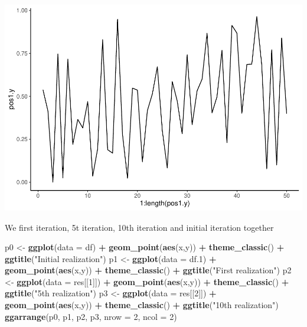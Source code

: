 \documentclass[
]{article}
\newenvironment{Shaded}{\begin{snugshade}}{\end{snugshade}}
\newcommand{\DataTypeTok}[1]{\textcolor[rgb]{0.13,0.29,0.53}{#1}}
\newcommand{\DecValTok}[1]{\textcolor[rgb]{0.00,0.00,0.81}{#1}}
\newcommand{\FloatTok}[1]{\textcolor[rgb]{0.00,0.00,0.81}{#1}}
\newcommand{\KeywordTok}[1]{\textcolor[rgb]{0.13,0.29,0.53}{\textbf{#1}}}
\newcommand{\NormalTok}[1]{#1}
\newcommand{\OperatorTok}[1]{\textcolor[rgb]{0.81,0.36,0.00}{\textbf{#1}}}
\newcommand{\StringTok}[1]{\textcolor[rgb]{0.31,0.60,0.02}{#1}}
\begin{document}
\includegraphics{project2_files/figure-latex/unnamed-chunk-27-2.pdf}

We first iteration, 5t iteration, 10th iteration and initial iteration
together

\begin{Shaded}
\begin{Highlighting}[]
\NormalTok{p0 <-}\StringTok{ }\KeywordTok{ggplot}\NormalTok{(}\DataTypeTok{data =}\NormalTok{ df) }\OperatorTok{+}\StringTok{ }\KeywordTok{geom_point}\NormalTok{(}\KeywordTok{aes}\NormalTok{(x,y)) }\OperatorTok{+}\StringTok{ }\KeywordTok{theme_classic}\NormalTok{() }\OperatorTok{+}\StringTok{ }\KeywordTok{ggtitle}\NormalTok{(}\StringTok{"Initial realization"}\NormalTok{)}
\NormalTok{p1 <-}\StringTok{ }\KeywordTok{ggplot}\NormalTok{(}\DataTypeTok{data =}\NormalTok{ df}\FloatTok{.1}\NormalTok{) }\OperatorTok{+}\StringTok{ }\KeywordTok{geom_point}\NormalTok{(}\KeywordTok{aes}\NormalTok{(x,y)) }\OperatorTok{+}\StringTok{ }\KeywordTok{theme_classic}\NormalTok{() }\OperatorTok{+}\StringTok{ }\KeywordTok{ggtitle}\NormalTok{(}\StringTok{"First realization"}\NormalTok{)}
\NormalTok{p2 <-}\StringTok{ }\KeywordTok{ggplot}\NormalTok{(}\DataTypeTok{data =}\NormalTok{ res[[}\DecValTok{1}\NormalTok{]]) }\OperatorTok{+}\StringTok{ }\KeywordTok{geom_point}\NormalTok{(}\KeywordTok{aes}\NormalTok{(x,y)) }\OperatorTok{+}\StringTok{ }\KeywordTok{theme_classic}\NormalTok{() }\OperatorTok{+}\StringTok{ }\KeywordTok{ggtitle}\NormalTok{(}\StringTok{"5th realization"}\NormalTok{)}
\NormalTok{p3 <-}\StringTok{ }\KeywordTok{ggplot}\NormalTok{(}\DataTypeTok{data =}\NormalTok{ res[[}\DecValTok{2}\NormalTok{]]) }\OperatorTok{+}\StringTok{ }\KeywordTok{geom_point}\NormalTok{(}\KeywordTok{aes}\NormalTok{(x,y)) }\OperatorTok{+}\StringTok{ }\KeywordTok{theme_classic}\NormalTok{() }\OperatorTok{+}\StringTok{ }\KeywordTok{ggtitle}\NormalTok{(}\StringTok{"10th realization"}\NormalTok{)}
\KeywordTok{ggarrange}\NormalTok{(p0, p1, p2, p3, }\DataTypeTok{nrow =} \DecValTok{2}\NormalTok{, }\DataTypeTok{ncol =} \DecValTok{2}\NormalTok{)}
\end{Highlighting}
\end{Shaded}
\end{document}
